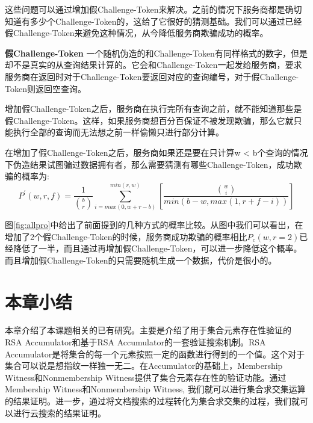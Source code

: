 这些问题可以通过增加假Challenge-Token来解决。之前的情况下服务商都是确切知道有多少个Challenge-Token的，这给了它很好的猜测基础。我们可以通过已经假Challenge-Token来避免这种情况，从今降低服务商欺骗成功的概率。

\textbf{假Challenge-Token} 一个随机伪造的和Challenge-Token有同样格式的数字，但是却不是真实的从查询结果计算的。它会和Challenge-Token一起发给服务商，要求服务商在返回时对于Challenge-Token要返回对应的查询编号，对于假Challenge-Token则返回空查询。

增加假Challenge-Token之后，服务商在执行完所有查询之前，就不能知道那些是假Challenge-Token。这样，如果服务商想百分百保证不被发现欺骗，那么它就只能执行全部的查询而无法想之前一样偷懒只进行部分计算。

在增加了假Challenge-Token之后，服务商如果还是要在只计算w < b个查询的情况下伪造结果试图骗过数据拥有者，那么需要猜测有哪些Challenge-Token，成功欺骗的概率为:
\begin{equation}P^\prime(w,r,f) = \frac{1}{\binom{b}{r}}\sum_{i=max(0,w+r-b)}^{min(r,w)}[\frac{\binom{w}{i}}{min(b-w,max(1,r+f-i))}]\end{equation}


图\ref{fig:allpro}中给出了前面提到的几种方式的概率比较。从图中我们可以看出，在增加了2个假Challenge-Token的时候，服务商成功欺骗的概率相比$P_c(w,r=2)$已经降低了一半，而且通过再增加假Challenge-Token，可以进一步降低这个概率。而且增加假Challenge-Token的只需要随机生成一个数据，代价是很小的。

\section{本章小结}
本章介绍了本课题相关的已有研究。主要是介绍了用于集合元素存在性验证的RSA Accumulator和基于RSA Accumulator的一套验证搜索机制。RSA Accumulator是将集合的每一个元素按照一定的函数进行得到的一个值。这个对于集合可以说是想指纹一样独一无二。在Accumulator的基础上，Membership Witness和Nonmembership Witness提供了集合元素存在性的验证功能。通过Membership Witness和Nonmembership Witness, 我们就可以进行集合求交集运算的结果证明。进一步，通过将文档搜索的过程转化为集合求交集的过程，我们就可以进行云搜索的结果证明。


